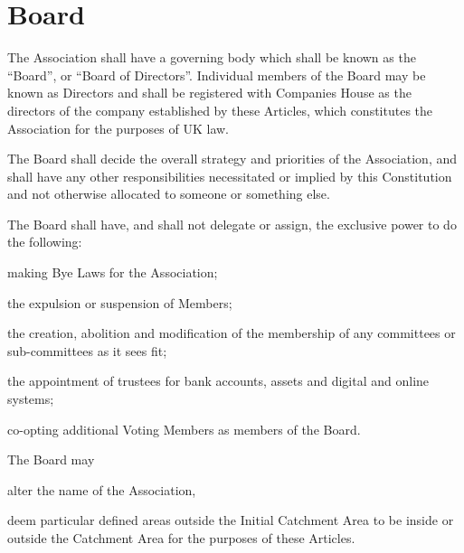 \documentclass[10pt]{mk-articles-of-association}
\newcommand{\EC}[0]{Board}
\newcommand{\Exec}[0]{\EC{} }
\begin{document}
\section{\Exec}
  \begin{constenum}

  \item The Association shall have a governing body which shall be
    known as the ``\EC{}'', or ``Board of Directors''. Individual
    members of the \Exec may be known as Directors and shall be
    registered with Companies House as the directors of the company
    established by these Articles, which constitutes the Association
    for the purposes of UK law.

  \item The \Exec shall decide the overall strategy and priorities of
    the Association, and shall have any other responsibilities
    necessitated or implied by this Constitution and not otherwise
    allocated to someone or something else.

  \item The \Exec shall have, and
    shall not delegate or assign, the exclusive power to do the
    following:\label{nondelegation}

    \begin{constenum}
      \item making Bye Laws for the Association;

      \item the expulsion or suspension of Members;

      \item the creation, abolition and modification of the membership of
        any committees or sub-committees as it sees fit;

      \item the appointment of trustees for bank accounts, assets and
        digital and online systems; \ITand

      \item co-opting additional Voting Members as members of the \EC{}.

    \end{constenum}

  \item The \Exec may
    \begin{constenum}
    \item alter the name of the Association, \ITor
    \item deem particular defined areas outside the Initial Catchment Area
      to be inside or outside the Catchment Area
      for the purposes of these Articles.
    \end{constenum}


\end{constenum}
\end{document}
